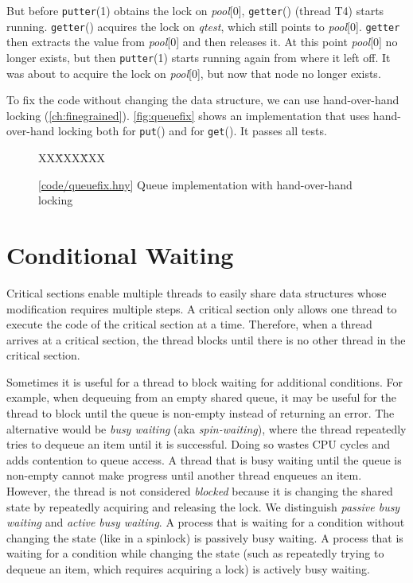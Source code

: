 \documentclass{report}
\newcommand{\harmonysource}[1]{
\begin{tabbing}
XX\=XXX\=XXX\kill
    
\end{tabbing}
}
\newcommand{\harmonylink}[1]{%
[\href{https://harmony.cs.cornell.edu/#1}{\underline{#1}}]%
}
\newenvironment{code}{
\tcolorbox
}{
\endtcolorbox
}
\begin{document}
But before \texttt{putter}(1) obtains
the lock on \textit{pool}[0], \texttt{getter}() (thread T4) starts
running.  \texttt{getter}() acquires the lock on \textit{qtest}, which
still points to \textit{pool}[0].  \texttt{getter} then extracts the
value from \textit{pool}[0] and then releases it.
At this point \textit{pool}[0] no longer exists, but then
\texttt{putter}(1) starts running again from where it left off.
It was about to acquire the lock on \textit{pool}[0], but now that
node no longer exists.

To fix the code without changing the data structure, we can use
hand-over-hand locking (\autoref{ch:finegrained}).
\autoref{fig:queuefix} shows an implementation
that uses hand-over-hand locking
both for \texttt{put}() and for \texttt{get}().  It passes all tests.

\begin{figure}
\begin{code}
\harmonysource{queuefix}
\end{code}
\caption{\harmonylink{code/queuefix.hny} Queue implementation with hand-over-hand locking}
\label{fig:queuefix}
\end{figure}

\chapter{Conditional Waiting}
\label{ch:condwait}

Critical sections enable multiple threads
to easily share data structures whose modification
requires multiple steps.
A critical section only allows one thread to execute the code
of the critical section at a time.
Therefore, when a thread arrives at a critical section,
the thread blocks until there is no other thread in the critical section.

%
%
Sometimes it is useful for a thread to block waiting for additional
conditions.
For example, when dequeuing from an empty shared queue,
it may be useful for the thread to block until the queue is non-empty
instead of returning an error.
The alternative would be \emph{busy waiting} (aka \emph{spin-waiting}),
where the thread repeatedly tries to dequeue an item until it is successful.
Doing so wastes CPU cycles and adds contention to queue access.
%
A thread that is busy waiting until the queue is non-empty cannot
make progress until another thread enqueues an item.
However, the thread is not considered \emph{blocked} because it is
changing the shared state by repeatedly acquiring and releasing the
lock.
We distinguish \emph{passive busy waiting} and \emph{active busy waiting}.
A process that is waiting for a condition without changing the state
(like in a spinlock) is passively busy waiting.
A process that is waiting for a condition while changing the state
(such as repeatedly trying to dequeue an item, which requires
acquiring a lock) is actively busy waiting.
\end{document}
